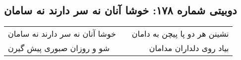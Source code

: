 \begin{center}
\section*{دوبیتی شماره ۱۷۸: خوشا آنان نه سر دارند نه سامان}
\label{sec:178}
\begin{longtable}{l p{0.5cm} r}
خوشا آنان نه سر دارند نه سامان
&&
نشینن هر دو پا پیچن به دامان
\\
شو و روزان صبوری پیش گیرن
&&
بیاد روی دلداران مدامان
\\
\end{longtable}
\end{center}
